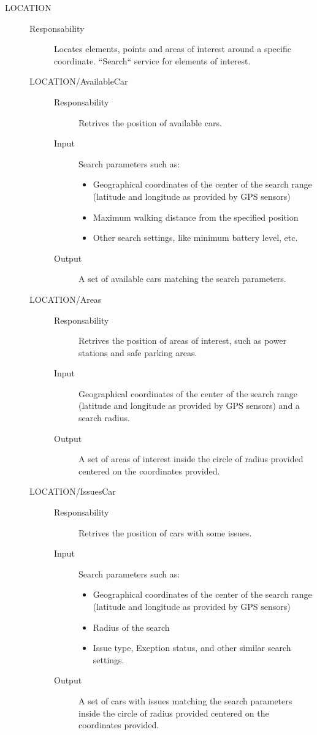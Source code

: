 \documentclass[11pt]{article} %
\begin{document}
\begin{description}
	\item[LOCATION] \hfill
	\begin{description}
		\item[Responsability] Locates elements, points and areas of interest around a specific coordinate. ``Search`` service for elements of interest.
	\item[LOCATION/AvailableCar] \hfill
		\begin{description}
			\item[Responsability] Retrives the position of available cars.
			\item[Input] Search parameters such as:
			\begin{itemize}
				\item Geographical coordinates of the center of the search range (latitude and longitude as provided by GPS sensors) 
				\item Maximum walking distance from the specified position
				\item Other search settings, like minimum battery level, etc.
			\end{itemize}
			\item[Output] A set of available cars matching the search parameters.
		\end{description}

	\item[LOCATION/Areas] \hfill
		\begin{description} 
			\item[Responsability] Retrives the position of areas of interest, such as power stations and safe parking areas.
			\item[Input] Geographical coordinates of the center of the search range (latitude and longitude as provided by GPS sensors) and a search radius.
			\item[Output] A set of areas of interest inside the circle of radius provided centered on the coordinates provided.
		\end{description}

	\item[LOCATION/IssuesCar] \hfill
		\begin{description}
			\item[Responsability] Retrives the position of cars with some issues.
			\item[Input] Search parameters such as:
			\begin{itemize}
				\item Geographical coordinates of the center of the search range (latitude and longitude as provided by GPS sensors) 
				\item Radius of the search
				\item Issue type, Exeption status, and other similar search settings.
			\end{itemize}
			\item[Output] A set of cars with issues matching the search parameters inside the circle of radius provided centered on the coordinates provided.
		\end{description}
	\end{description}


\end{description}
\end{document}
